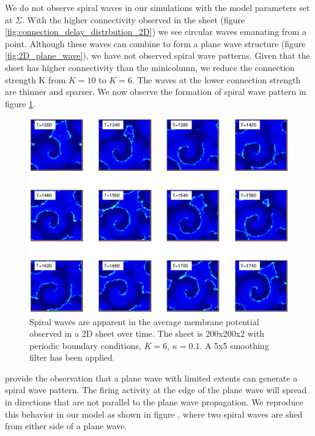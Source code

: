 We do not observe spiral waves in our simulations with the model parameters set at $\Sigma$.
With the higher connectivity observed in the sheet (figure \ref{fig:connection_delay_distrbution_2D}) we see circular waves emanating from a point.
Although these waves can combine to form a plane wave structure (figure \ref{fig:2D_plane_wave}), we have not observed spiral wave patterns.
Given that the sheet has higher connectivity than the minicolumn, we reduce the connection strength K from $K=10$ to $K=6$.
The waves at the lower connection strength are thinner and sparser.
We now observe the formation of spiral wave pattern in figure \ref{fig:2DSpiralWaves}.
\begin{figure}[!htb]
 \caption{ Spiral waves are apparent in the average membrane potential observed in a 2D sheet over time. 
           The sheet is 200x200x2 with periodic boundary conditions, $K=6$, $\kappa=0.1$.
           A 5x5 smoothing filter has been applied. }
 \label{fig:2DSpiralWaves}
 \centering
   \includegraphics[width=\textwidth]{fig/SpiralWaves2D_K6_kappa0p1_M4}
\end{figure}
\FloatBarrier

\citet{Huang2010} provide the observation that a plane wave with limited extents can generate a spiral wave pattern.
The firing activity at the edge of the plane wave will spread in directions that are not parallel to the plane wave propagation.
We reproduce this behavior in our model as shown in figure , where two spiral waves are shed from either side of a plane wave.

